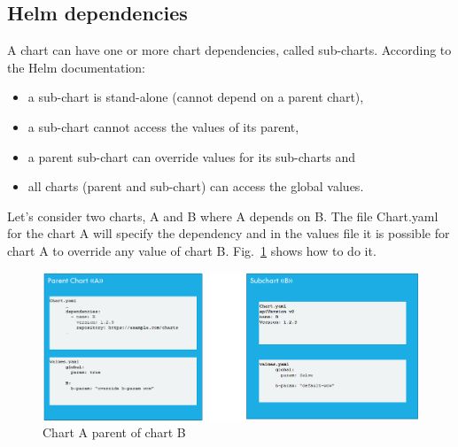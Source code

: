 \documentclass[a4paper,
               keeplastbox,   %
               ]{jacow}
\begin{document}
\subsection{Helm dependencies} \label{helm}
A chart can have one or more chart dependencies, called sub-charts. According to the Helm documentation:
\begin{itemize}
    \item a sub-chart is stand-alone (cannot depend on a parent chart),
    \item a sub-chart cannot access the values of its parent,
    \item a parent sub-chart can override values for its sub-charts and
    \item all charts (parent and sub-chart) can access the global values.
\end{itemize}

Let’s consider two charts, A and B where A depends on B. The file Chart.yaml for the chart A will specify the dependency and in the values file it is possible for chart A to override any value of chart B. Fig.~\ref{fig:a_parent_b} shows how to do it.

\begin{figure}[!htb]
   \centering
   \includegraphics*[width=0.8\columnwidth]{A_parent_B}
   \caption{Chart A parent of chart B}
   \label{fig:a_parent_b}
\end{figure}
\end{document}
